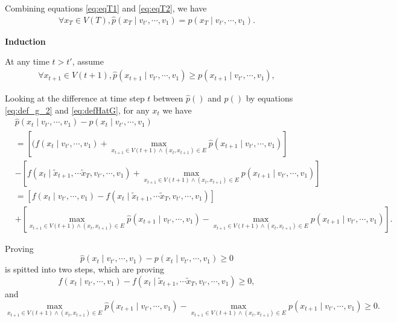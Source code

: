 \documentclass[12pt]{article}
\begin{document}
Combining equations \eqref{eq:eqT1} and \eqref{eq:eqT2}, we have
\begin{equation}
\label{eq:inductionInit}
\begin{aligned}
\forall x_{T} \in V(T), \hat{p}(x_{T} \mid v_{t'} , \cdots , v_{1} ) = p(x_{T} \mid v_{t'} , \cdots , v_{1}).
\end{aligned}
\end{equation}

\textbf{Induction}

At any time $ t > t' $, assume
\begin{equation}
\label{eq:inductionAssumption}
\begin{aligned}
\forall x_{t+1} \in V(t+1), \hat{p}(x_{t+1} \mid v_{t'} , \cdots , v_{1} ) \geq p(x_{t+1} \mid v_{t'} , \cdots , v_{1} ),
\end{aligned}
\end{equation}

Looking at the difference at time step $ t $ between $ \hat{p}() $ and $ p() $ by equations \eqref{eq:def_g_2} and \eqref{eq:defHatG}, for any $ x_{t} $ we have
\begin{equation}
\label{eq:extendDifference}
\begin{aligned}
& \hat{p}( x_{t} \mid v_{t'} , \cdots , v_{1} ) - p(x_{t} \mid v_{t'} , \cdots , v_{1} ) \\
& = \left[( f( x_{t} \mid v_{t'} , \cdots , v_{1} ) + \max_{x_{t+1} \in V(t+1) \land (x_{t}, x_{t+1}) \in E } \hat{p}( x_{t+1} \mid v_{t'} , \cdots , v_{1} ) \right]  \\
& - \left[  f( x_{t} \mid \tilde{x}_{t+1}, \cdots \tilde{x}_{T}, v_{t'} , \cdots , v_{1} ) +  \max_{x_{t+1} \in V(t+1) \land ( x_{t}, x_{t+1} ) \in E } p( x_{t+1} \mid v_{t'} , \cdots , v_{1} ) \right]  \\
& = \left[ f(x_{t} \mid v_{t'} , \cdots , v_{1} ) - f(x_{t} \mid \tilde{x}_{t+1}, \cdots \tilde{x}_{T}, v_{t'} , \cdots , v_{1} ) \right] \\
& + \left[ \max_{ x_{t+1} \in V(t+1) \land ( x_{t}, x_{t+1} ) \in E } \hat{p}( x_{t+1} \mid v_{t'} , \cdots , v_{1} ) - \max_{x_{t+1} \in V(t+1) \land ( x_{t}, x_{t+1} ) \in E } p( x_{t+1} \mid v_{t'} , \cdots , v_{1} ) \right] .
\end{aligned}
\end{equation} 

Proving 
\begin{equation}
\label{eq:extendDifference_geq_0}
\hat{p}( x_{t} \mid v_{t'} , \cdots , v_{1} ) - p( x_{t} \mid v_{t'} , \cdots , v_{1} ) \geq 0
\end{equation}
 is spitted into two steps, which are proving
\begin{equation}
\label{eq:inductionGEQ1}
f( x_{t} \mid v_{t'} , \cdots , v_{1} ) - f(x_{t} \mid \tilde{x}_{t+1}, \cdots \tilde{x}_{T}, v_{t'} , \cdots , v_{1} ) \geq 0,
\end{equation}
and
\begin{equation}
\label{eq:max_delta}
\max_{ x_{t+1} \in V(t+1) \land ( x_{t}, x_{t+1} ) \in E } \hat{p}( x_{t+1} \mid v_{t'} , \cdots , v_{1} ) - \max_{ x_{t+1} \in V(t+1) \land ( x_{t}, x_{t+1} ) \in E } p( x_{t+1} \mid v_{t'} , \cdots , v_{1} ) \geq 0.
\end{equation}
\end{document}
